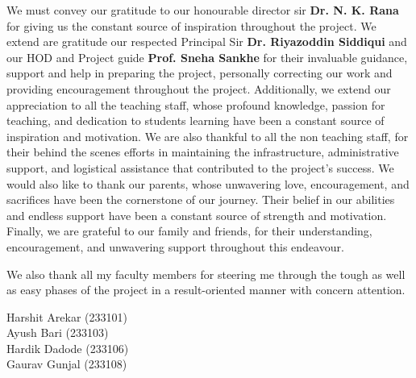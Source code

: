 \documentclass[12pt,a4paper,oneside]{report}
\begin{document}
We must convey our gratitude to our honourable director sir \textbf{Dr. N. K. Rana} for giving us the constant source of inspiration throughout the project. We extend are gratitude our respected Principal Sir \textbf{Dr. Riyazoddin Siddiqui} and our HOD and Project guide \textbf{Prof. Sneha Sankhe} for their invaluable guidance, support and help in preparing the project, personally correcting our work and providing encouragement throughout the project. Additionally, we extend our appreciation to all the teaching staff, whose profound knowledge, passion for teaching, and dedication to students learning have been a constant source of inspiration and motivation. We are also thankful to all the non teaching staff, for their behind the scenes efforts in maintaining the infrastructure, administrative support, and logistical assistance that contributed to the project’s success. We would also like to thank our parents, whose unwavering love, encouragement, and sacrifices have been the cornerstone of our journey. Their belief in our abilities and endless support have been a constant source of strength and motivation. Finally, we are grateful to our family and friends, for their understanding, encouragement, and unwavering support throughout this endeavour.

We also thank all my faculty members for steering me through the tough as well as easy phases of the project in a result-oriented manner with concern attention.


\vfill
\begin{flushright}
Harshit Arekar (233101)\\[0.4em]
Ayush Bari (233103)\\[0.4em]
Hardik Dadode (233106)\\[0.4em]
Gaurav Gunjal (233108)
\end{flushright}
\end{document}
